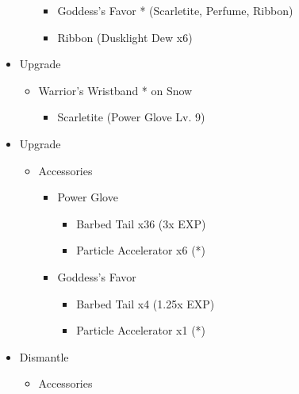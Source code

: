 \begin{paracol}{2}
\begin{upgrade}
\begin{itemize}
\begin{itemize}
			            \begin{itemize}
				            \item Goddess's Favor * (Scarletite, Perfume, Ribbon)
				            \item Ribbon (Dusklight Dew x6)
			            \end{itemize}
		      \end{itemize}
		\item Upgrade
		      \begin{itemize}
			      \item Warrior's Wristband * on Snow
			            \begin{itemize}
				            \item Scarletite (Power Glove Lv. 9)
			            \end{itemize}
		      \end{itemize}
	\end{itemize}
\end{upgrade}
\switchcolumn
\begin{upgrade}
	\begin{itemize}
		\item Upgrade
		      \begin{itemize}
			      \item Accessories
			            \begin{itemize}
				            \item Power Glove
				                  \begin{itemize}
					                  \item Barbed Tail x36 (3x EXP)
					                  \item Particle Accelerator x6 (*)
				                  \end{itemize}
				            \item Goddess's Favor
				                  \begin{itemize}
					                  \item Barbed Tail x4 (1.25x EXP)
					                  \item Particle Accelerator x1 (*)
				                  \end{itemize}
			            \end{itemize}
		      \end{itemize}
		\item Dismantle
		      \begin{itemize}
			      \item Accessories
			            \begin{itemize}

\end{itemize}
\end{itemize}
\end{itemize}
\end{upgrade}
\end{paracol}
